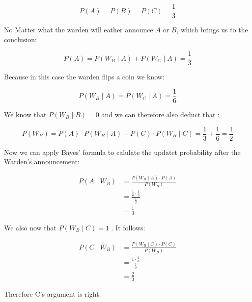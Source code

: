 \documentclass{article}
\begin{document}
\[P(A) = P(B)= P(C) = \frac{1}{3} \]

No Matter what the warden will eather announce $A$ or $B$, which brings us to the conclusion:

\[P(A)= P(W_B \mid A) + P(W_C \mid A) =\frac{1}{3}\]

Because in this case the warden flips a coin we know:

\[ P(W_B \mid A)= P(W_C \mid A) = \frac{1}{6} \]

We know that $P(W_B\mid B) = 0$  and we can therefore also  deduct that :

\[ P(W_B)= P(A) \cdot P(W_B \mid A) + P(C) \cdot P(W_B\mid C) = \frac{1}{3}+\frac{1}{6}=\frac{1}{2}\]

Now we can apply Bayes' formula to calulate the updatet probability after the Warden's announcement:

\begin{align*}
 P(A \mid W_B)&=\frac{P(W_B \mid A)\cdot P(A)}{P(W_B)} \\
&= \frac{\frac{1}{6} \cdot \frac{1}{3} }{\frac{1}{2}} \\
&=\frac{1}{3} 
\end{align*}

We also now that $P( W_B\mid C)=1$ . It follows:

\begin{align*}
 P(C \mid W_B)&=\frac{P(W_B \mid C)\cdot P(C)}{P(W_B)} \\
&= \frac{1 \cdot \frac{1}{3} }{\frac{1}{2}} \\
&=\frac{2}{3} 
\end{align*}

Therefore C's argument is right.
\end{document}
